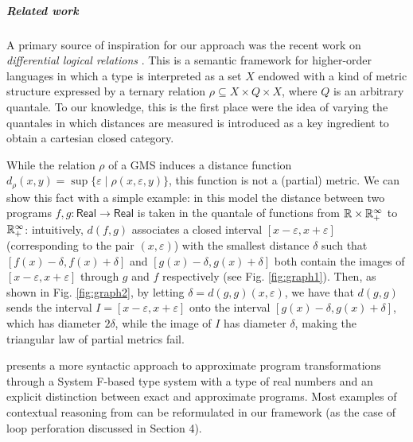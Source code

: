 \subparagraph*{Related work}


A primary source of inspiration for our approach was the recent work on  \emph{differential logical relations} \cite{dallago:differential-stlc}. This is a semantic framework for higher-order languages in which a type is interpreted as a set $X$ endowed with a kind of metric structure expressed by a ternary relation $\rho \subseteq X\times Q\times X$, where $Q$ is an arbitrary quantale. To our knowledge, this is the first place were the idea of varying the quantales in which distances are measured is introduced as a key ingredient to obtain a cartesian closed category.

While the relation $\rho$ of a GMS induces a distance function $d_{\rho}(x,y)=\sup\{\varepsilon\mid \rho(x,\varepsilon,y)\}$, this function is not a (partial) metric. We can show this fact with a simple example: in this model the distance between two programs 
 $f,g:\mathsf{Real}\to \mathsf{Real}$ is taken in the quantale of functions from $\mathbb{R}\times \mathbb{R}_{+}^{\infty}$ to $\mathbb{R}_{+}^{\infty}$: intuitively, 
  $d(f,g)$ associates a closed interval $[x-\varepsilon,x+\varepsilon]$ (corresponding to the pair $(x,\varepsilon)$) with the smallest distance $\delta$ such that $[ f(x)-\delta, f(x)+\delta]$ and $[g(x)-\delta,g(x)+\delta]$ both contain the images of $[x-\varepsilon, x+\varepsilon]$ through
 $g$ and $f$ respectively (see Fig. \ref{fig:graph1}). Then, as shown in Fig. \ref{fig:graph2}, by letting $\delta=d(g,g)(x,\varepsilon)$, we have that $d(g,g)$ sends the interval $I=[x-\varepsilon, x+\varepsilon]$ onto the interval $[g(x)-\delta, g(x)+\delta]$, which has diameter $2\delta$, while the image of $I$ has diameter $\delta$, making the triangular law of partial metrics fail. 



\cite{chaudhuri} presents a more syntactic approach to approximate program transformations through a System F-based type system with a type of real numbers and an explicit distinction between exact and approximate programs.
Most examples of contextual reasoning from \cite{chaudhuri} can be  reformulated in our framework (as the case of loop perforation discussed in Section 4). 



